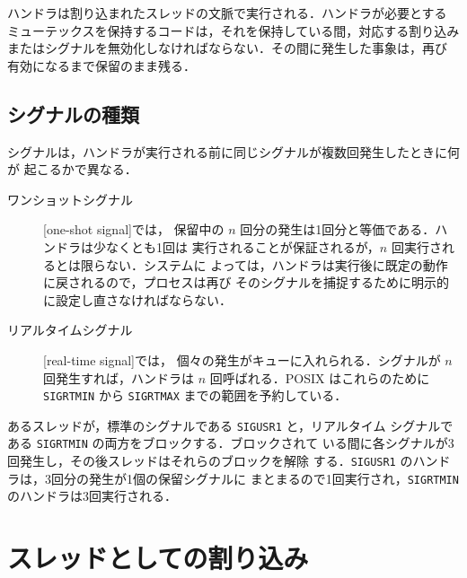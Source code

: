 \documentclass[../main.tex]{subfiles}
\begin{document}
\begin{keypoint}
  ハンドラは割り込まれたスレッドの文脈で実行される．ハンドラが必要とする
  ミューテックスを保持するコードは，それを保持している間，対応する割り込み
  またはシグナルを無効化しなければならない．その間に発生した事象は，再び
  有効になるまで保留のまま残る．
\end{keypoint}

\subsection{シグナルの種類}
\label{sec:l05-types}

シグナルは，ハンドラが実行される前に同じシグナルが複数回発生したときに何が
起こるかで異なる．
\begin{description}
  \item[ワンショットシグナル]
    [one-shot signal]では，
    保留中の $n$ 回分の発生は1回分と等価である．ハンドラは少なくとも1回は
    実行されることが保証されるが，$n$ 回実行されるとは限らない．システムに
    よっては，ハンドラは実行後に既定の動作に戻されるので，プロセスは再び
    そのシグナルを捕捉するために明示的に設定し直さなければならない．
  \item[リアルタイムシグナル]
    [real-time signal]では，
    個々の発生がキューに入れられる．シグナルが $n$ 回発生すれば，ハンドラは
    $n$ 回呼ばれる．POSIX はこれらのために \texttt{SIGRTMIN} から
    \texttt{SIGRTMAX} までの範囲を予約している．
\end{description}

\begin{example}
  あるスレッドが，標準のシグナルである \texttt{SIGUSR1} と，リアルタイム
  シグナルである \texttt{SIGRTMIN} の両方をブロックする．ブロックされて
  いる間に各シグナルが3回発生し，その後スレッドはそれらのブロックを解除
  する．\texttt{SIGUSR1} のハンドラは，3回分の発生が1個の保留シグナルに
  まとまるので1回実行され，\texttt{SIGRTMIN} のハンドラは3回実行される．
\end{example}

\section{スレッドとしての割り込み}
\label{sec:l05-int-threads}
\end{document}
